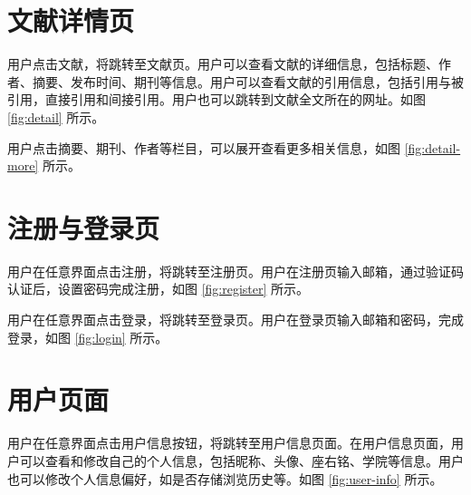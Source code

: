 \documentclass[UTF8,openany]{ctexbook}
\begin{document}
\section{文献详情页}

用户点击文献，将跳转至文献页。用户可以查看文献的详细信息，包括标题、作者、摘要、发布时间、期刊等信息。用户可以查看文献的引用信息，包括引用与被引用，直接引用和间接引用。用户也可以跳转到文献全文所在的网址。如图 \ref{fig:detail} 所示。


用户点击摘要、期刊、作者等栏目，可以展开查看更多相关信息，如图 \ref{fig:detail-more} 所示。


\section{注册与登录页}

用户在任意界面点击注册，将跳转至注册页。用户在注册页输入邮箱，通过验证码认证后，设置密码完成注册，如图 \ref{fig:register} 所示。


用户在任意界面点击登录，将跳转至登录页。用户在登录页输入邮箱和密码，完成登录，如图 \ref{fig:login} 所示。


\section{用户页面}

用户在任意界面点击用户信息按钮，将跳转至用户信息页面。在用户信息页面，用户可以查看和修改自己的个人信息，包括昵称、头像、座右铭、学院等信息。用户也可以修改个人信息偏好，如是否存储浏览历史等。如图 \ref{fig:user-info} 所示。
\end{document}
